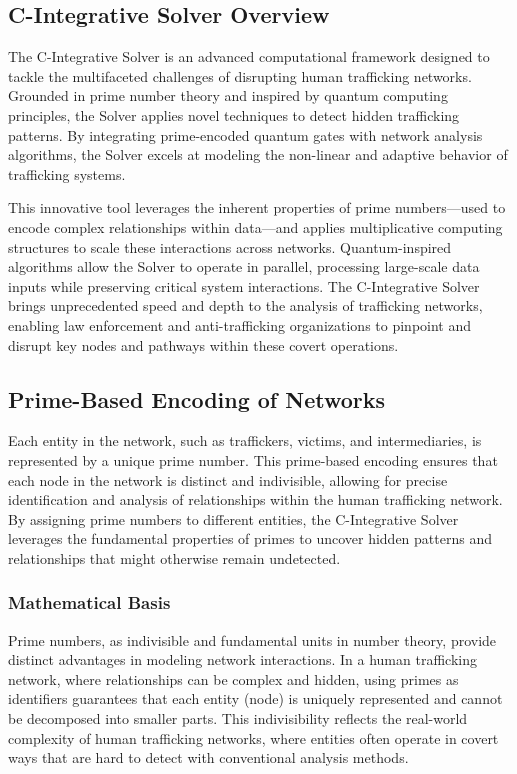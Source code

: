 \documentclass[%
 preprint, linenumbers,
 amsmath,amssymb,
 aps, physrev,
]{revtex4-2}
\begin{document}
\subsection{C-Integrative Solver Overview} The C-Integrative Solver is an advanced computational framework designed to tackle the multifaceted challenges of disrupting human trafficking networks. Grounded in prime number theory and inspired by quantum computing principles, the Solver applies novel techniques to detect hidden trafficking patterns. By integrating prime-encoded quantum gates with network analysis algorithms, the Solver excels at modeling the non-linear and adaptive behavior of trafficking systems.

This innovative tool leverages the inherent properties of prime numbers—used to encode complex relationships within data—and applies multiplicative computing structures to scale these interactions across networks. Quantum-inspired algorithms allow the Solver to operate in parallel, processing large-scale data inputs while preserving critical system interactions. The C-Integrative Solver brings unprecedented speed and depth to the analysis of trafficking networks, enabling law enforcement and anti-trafficking organizations to pinpoint and disrupt key nodes and pathways within these covert operations.

\subsection{Prime-Based Encoding of Networks}

Each entity in the network, such as traffickers, victims, and intermediaries, is represented by a unique prime number. This prime-based encoding ensures that each node in the network is distinct and indivisible, allowing for precise identification and analysis of relationships within the human trafficking network. By assigning prime numbers to different entities, the C-Integrative Solver leverages the fundamental properties of primes to uncover hidden patterns and relationships that might otherwise remain undetected.

\subsubsection{Mathematical Basis}

Prime numbers, as indivisible and fundamental units in number theory, provide distinct advantages in modeling network interactions. In a human trafficking network, where relationships can be complex and hidden, using primes as identifiers guarantees that each entity (node) is uniquely represented and cannot be decomposed into smaller parts. This indivisibility reflects the real-world complexity of human trafficking networks, where entities often operate in covert ways that are hard to detect with conventional analysis methods.
\end{document}
